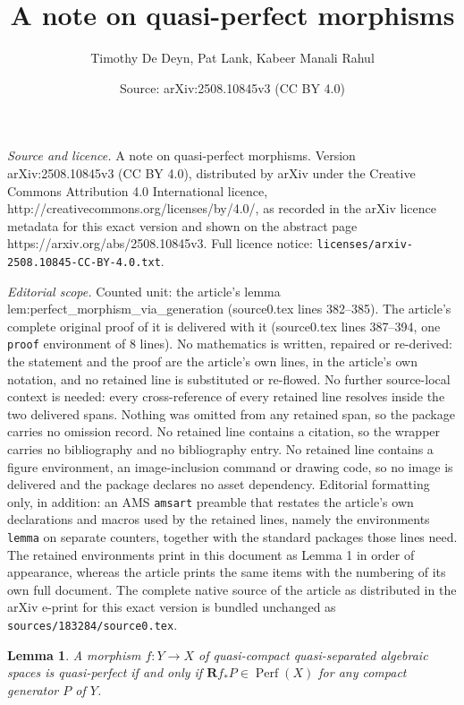 \documentclass[10pt,a4paper]{amsart}
\title{A note on quasi-perfect morphisms}
\author{Timothy De Deyn, Pat Lank, Kabeer Manali Rahul}
\date{Source: arXiv:2508.10845v3 (CC BY 4.0)}
\newtheorem{lemma}{Lemma}
\begin{document}
\maketitle

\noindent\emph{Source and licence.} A note on quasi-perfect morphisms. Version arXiv:2508.10845v3 (CC BY 4.0), distributed by arXiv under the Creative Commons Attribution 4.0 International licence, http://creativecommons.org/licenses/by/4.0/, as recorded in the arXiv licence metadata for this exact version and shown on the abstract page https://arxiv.org/abs/2508.10845v3. Full licence notice: \texttt{licenses/arxiv-2508.10845-CC-BY-4.0.txt}.\par\smallskip

\noindent\textit{Editorial scope.} Counted unit: the article's lemma lem:perfect\_morphism\_via\_generation (source0.tex lines 382--385). The article's complete original proof of it is delivered with it (source0.tex lines 387--394, one \texttt{proof} environment of 8 lines). No mathematics is written, repaired or re-derived: the statement and the proof are the article's own lines, in the article's own notation, and no retained line is substituted or re-flowed.  No further source-local context is needed: every cross-reference of every retained line resolves inside the two delivered spans.  Nothing was omitted from any retained span, so the package carries no omission record.  No retained line contains a citation, so the wrapper carries no bibliography and no bibliography entry.  No retained line contains a figure environment, an image-inclusion command or drawing code, so no image is delivered and the package declares no asset dependency.  Editorial formatting only, in addition: an AMS \texttt{amsart} preamble that restates the article's own declarations and macros used by the retained lines, namely the environments \texttt{lemma} on separate counters, together with the standard packages those lines need.  The retained environments print in this document as Lemma 1 in order of appearance, whereas the article prints the same items with the numbering of its own full document.  The complete native source of the article as distributed in the arXiv e-print for this exact version is bundled unchanged as \texttt{sources/183284/source0.tex}.
\begin{lemma}
    \label{lem:perfect_morphism_via_generation}
    A morphism $f\colon Y \to X$ of quasi-compact quasi-separated algebraic spaces is quasi-perfect if and only if $\mathbf{R}f_\ast P\in \operatorname{Perf}(X)$ for any compact generator $P$ of $Y$.
\end{lemma}
\end{document}
